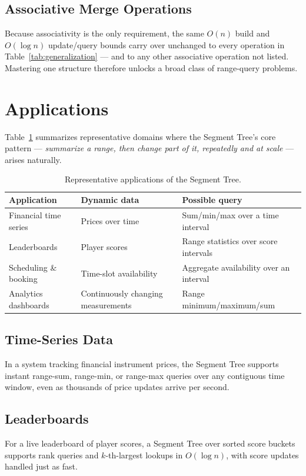 \documentclass[11pt]{article}
\begin{document}
\subsection{Associative Merge Operations}
Because associativity is the only requirement, the same $O(n)$ build and $O(\log n)$ update/query bounds carry over unchanged to every operation in Table~\ref{tab:generalization} --- and to any other associative operation not listed. Mastering one structure therefore unlocks a broad class of range-query problems.

\section{Applications}

Table~\ref{tab:applications} summarizes representative domains where the Segment Tree's core pattern --- \emph{summarize a range, then change part of it, repeatedly and at scale} --- arises naturally.

\begin{table}[h]
\centering
\caption{Representative applications of the Segment Tree.}
\label{tab:applications}
\begin{tabular}{p{3.1cm}p{4.3cm}p{5.3cm}}
\toprule
\textbf{Application} & \textbf{Dynamic data} & \textbf{Possible query} \\
\midrule
Financial time series & Prices over time & Sum/min/max over a time interval \\
Leaderboards & Player scores & Range statistics over score intervals \\
Scheduling \& booking & Time-slot availability & Aggregate availability over an interval \\
Analytics dashboards & Continuously changing measurements & Range minimum/maximum/sum \\
\bottomrule
\end{tabular}
\end{table}

\subsection{Time-Series Data}
In a system tracking financial instrument prices, the Segment Tree supports instant range-sum, range-min, or range-max queries over any contiguous time window, even as thousands of price updates arrive per second.

\subsection{Leaderboards}
For a live leaderboard of player scores, a Segment Tree over sorted score buckets supports rank queries and $k$-th-largest lookups in $O(\log n)$, with score updates handled just as fast.
\end{document}

